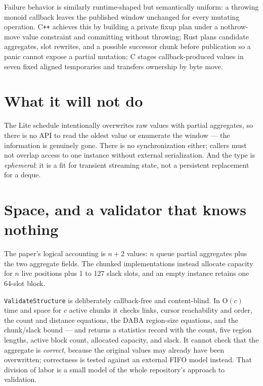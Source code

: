 \documentclass[11pt,twoside,openright]{book}
\newcommand{\code}[1]{\texorpdfstring{\textcolor{d7ink}{\texttt{#1}}}{#1}}
\newcommand{\bigoh}[1]{$\mathrm{O}(#1)$}
\begin{document}
Failure behavior is similarly runtime-shaped but semantically uniform: a
throwing monoid callback leaves the published window unchanged for every
mutating operation. C\texttt{++} achieves this by building a private fixup plan
under a nothrow-move value constraint and committing without throwing; Rust
plans candidate aggregates, slot rewrites, and a possible successor chunk before
publication so a panic cannot expose a partial mutation; C stages
callback-produced values in seven fixed aligned temporaries and transfers
ownership by byte move.

\section{What it will not do}

\begin{caveatbox}
The Lite schedule intentionally overwrites raw values with partial aggregates,
so there is no API to read the oldest value or enumerate the window --- the
information is genuinely gone. There is no synchronization either; callers must
not overlap access to one instance without external serialization. And the type
is \emph{ephemeral}: it is a fit for transient streaming state, not a persistent
replacement for a deque.
\end{caveatbox}

\section{Space, and a validator that knows nothing}

The paper's logical accounting is $n + 2$ values: $n$ queue partial aggregates
plus the two aggregate fields. The chunked implementations instead allocate
capacity for $n$ live positions plus 1 to 127 slack slots, and an empty instance
retains one 64-slot block.

\code{ValidateStructure} is deliberately callback-free and content-blind. In
\bigoh{c} time and space for $c$ active chunks it checks links, cursor
reachability and order, the count and distance equations, the DABA region-size
equations, and the chunk/slack bound --- and returns a statistics record with the
count, five region lengths, active block count, allocated capacity, and slack.
It cannot check that the aggregate is \emph{correct}, because the original values
may already have been overwritten; correctness is tested against an external FIFO
model instead. That division of labor is a small model of the whole repository's
approach to validation.
\end{document}
